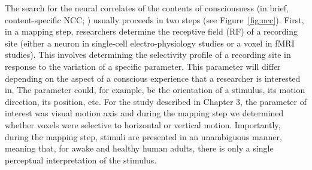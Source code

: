 The search for the neural correlates of the contents of consciousness (in brief, content-specific NCC; \cite{Koch2016}) usually proceeds in two steps (see Figure~\ref{fig:ncc}). First, in a mapping step, researchers determine the receptive field (RF) of a recording site (either a neuron in single-cell electro-physiology studies or a voxel in fMRI studies). This involves determining the selectivity profile of a recording site in response to the variation of a specific parameter. This parameter will differ depending on the aspect of a conscious experience that a researcher is interested in. The parameter could, for example, be the orientation of a stimulus, its motion direction, its position, etc. For the study described in Chapter 3, the parameter of interest was visual motion axis and during the mapping step we determined whether voxels were selective to horizontal or vertical motion. Importantly, during the mapping step, stimuli are presented in an unambiguous manner, meaning that, for awake and healthy human adults, there is only a single perceptual interpretation of the stimulus.

